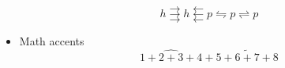 \documentclass[11pt]{article}
\def\Latinalphabets{ABCDEFGHIJKLMNOPQRSTUVWXYZ}
\def\latinalphabets{abcdefghijklmnopqrstuvwxyz}
\def\Greekalphabets{%
  \Alpha      \Beta       \Gamma      \Delta      \Epsilon
  \Zeta       \Eta        \Theta      \varTheta   \Iota
  \Kappa      \Lambda     \Mu         \Nu         \Xi
  \Omicron    \Pi         \Rho        \Sigma      \Tau
  \Upsilon    \Phi        \Chi        \Psi        \Omega
}
\def\greekalphabets{%
  \alpha      \beta       \gamma      \delta      \epsilon
   \zeta       \eta        \theta      \vartheta 
  \iota       \kappa      \varkappa   \lambda     \mu
  \nu         \xi         \omicron    \pi \varpi        \rho
  \varrho     \sigma      \varsigma   \tau        \upsilon
  \phi        \varphi     \chi        \psi        \omega
}
\begin{document}
\begin{itemize}
\[          h \rightthreearrows h \leftthreearrows
          p \leftrightharpoons       p \rightleftharpoons
          p \]
  \item Math accents
        \[\widehat{1+2+3+4}+\widetilde{5+6+7+8}\]


\end{itemize}
\end{document}
